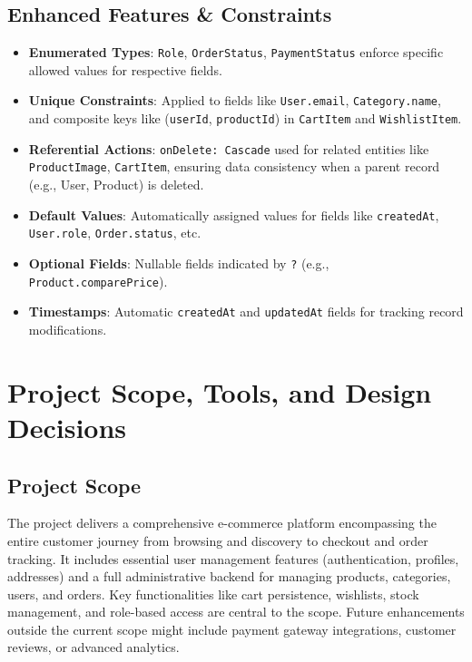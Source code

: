 \documentclass{article}
\begin{document}
\subsection{Enhanced Features \& Constraints}
\begin{itemize}[label=\textbullet]
    \item \textbf{Enumerated Types}: \texttt{Role}, \texttt{OrderStatus}, \texttt{PaymentStatus} enforce specific allowed values for respective fields.
    \item \textbf{Unique Constraints}: Applied to fields like \texttt{User.email}, \texttt{Category.name}, and composite keys like (\texttt{userId}, \texttt{productId}) in \texttt{CartItem} and \texttt{WishlistItem}.
    \item \textbf{Referential Actions}: \texttt{onDelete: Cascade} used for related entities like \texttt{ProductImage}, \texttt{CartItem}, ensuring data consistency when a parent record (e.g., User, Product) is deleted.
    \item \textbf{Default Values}: Automatically assigned values for fields like \texttt{createdAt}, \texttt{User.role}, \texttt{Order.status}, etc.
    \item \textbf{Optional Fields}: Nullable fields indicated by \texttt{?} (e.g., \texttt{Product.comparePrice}).
    \item \textbf{Timestamps}: Automatic \texttt{createdAt} and \texttt{updatedAt} fields for tracking record modifications.
\end{itemize}

\section{Project Scope, Tools, and Design Decisions}

\subsection{Project Scope}
The project delivers a comprehensive e-commerce platform encompassing the entire customer journey from browsing and discovery to checkout and order tracking. It includes essential user management features (authentication, profiles, addresses) and a full administrative backend for managing products, categories, users, and orders. Key functionalities like cart persistence, wishlists, stock management, and role-based access are central to the scope. Future enhancements outside the current scope might include payment gateway integrations, customer reviews, or advanced analytics.
\end{document}
